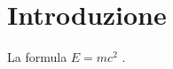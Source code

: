 \documentclass{article}
\begin{document}
\section{Introduzione}
La formula $E = mc^2$ \cite{einstein}.
\end{document}
